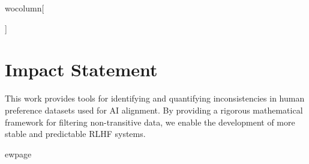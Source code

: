\documentclass{article}
\begin{document}
	wocolumn[


\begin{abstract}
Current Reinforcement Learning from Human Feedback (RLHF) strategies rely on an implicit ``scalar hypothesis'' that collapses complex, multidimensional human preferences into a single scalar value. This assumption fails when human preferences exhibit cyclic contradictions ($A \succ B \succ C \succ A$) or transitive inconsistencies. In this paper, we introduce a topological framework for analyzing preference data using Hodge decomposition on graph-based preference manifolds. By analyzing 160,800 Anthropic HH-RLHF prompt pairs, we identify that approximately 30\% of the data exhibits strong topological inconsistencies ($H^1 
eq 0$), making it mathematically impossible to represent within a standard scalar reward model without introducing significant bias or instability. We present a discrete Hodge-filtering approach that isolates the consistent gradient component from the inconsistent cyclic components. Our results demonstrate that Hodge-filtered reward models provide more stable training signals and prevent the generalization of cyclic biases that are otherwise exploitable by RL agents.
\end{abstract}

\vskip 0.3in
]

\printAffiliationsAndNotice{}








\section*{Impact Statement}
This work provides tools for identifying and quantifying inconsistencies in human preference datasets used for AI alignment. By providing a rigorous mathematical framework for filtering non-transitive data, we enable the development of more stable and predictable RLHF systems.





ewpage
\appendix

\end{document}
